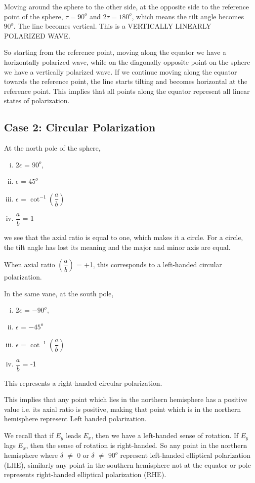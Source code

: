 Moving around the sphere to the other side, at the opposite side to the reference point of the sphere, $\tau = 90^{o}$ and $2\tau = 180^{o}$, which means the tilt angle becomes $90^{o}$. The line becomes vertical. This is a VERTICALLY LINEARLY POLARIZED WAVE. 

So starting from the reference point, moving along the equator we have a horizontally polarized wave, while on the diagonally opposite point on the sphere we have a vertically polarized wave. If we continue moving along the equator towards the reference point, the line starts tilting and becomes horizontal at the reference point. This implies that all points along the equator represent all linear states of polarization.

\subsection{Case 2: Circular Polarization}
At the north pole of the sphere,
\begin{enumerate}[(i)]
\item 	$2\epsilon$ = $90^{o}$, 
\item	$\epsilon$ = $45^{o}$
\item	$\epsilon$ = $\cot^{-1}(\dfrac{a}{b})$
\item	$\dfrac{a}{b}$ = 1
\end{enumerate}
we see that the axial ratio is equal to one, which makes it a circle. For a circle, the tilt angle has lost its meaning and the major and minor axis are equal.

When axial ratio $(\dfrac{a}{b})$ = +1, this corresponds to a left-handed circular polarization.

In the same vane, at the south pole,
\begin{enumerate}[(i)]
\item	$2\epsilon$ = $-90^{o}$, 
\item $\epsilon$ = $-45^{o}$
\item $\epsilon$ = $\cot^{-1}(\dfrac{a}{b})$
\item $\dfrac{a}{b}$ = -1
\end{enumerate}	
This represents a right-handed circular polarization.

This implies that any point which lies in the northern hemisphere has a positive value i.e. its axial ratio is positive, making that point which is in the northern hemisphere represent Left handed polarization.

We recall that if $E_{y}$ leads $E_{x}$, then we have a left-handed sense of rotation. If $E_{y}$ lags $E_{x}$, then the sense of rotation is right-handed. So any point in the northern hemisphere where $\delta$ $\neq$ 0 or $\delta$ $\neq$ $90^{o}$ represent left-handed elliptical polarization  (LHE), similarly any point in the southern hemisphere not at the equator or pole represents right-handed elliptical polarization (RHE).

